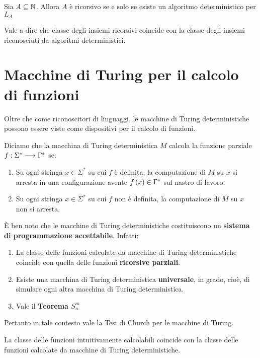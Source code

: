 \documentclass{lectures}
\begin{document}
\begin{theorem}
    Sia \(A\subseteq \mathbb{N}\). Allora \(A\) è ricorsivo se e solo se esiste un algoritmo deterministico per \(L_A\)
    
    Vale a dire che classe degli insiemi ricorsivi coincide con la classe degli insiemi riconosciuti da algoritmi deterministici.
\end{theorem}
\section{Macchine di Turing per il calcolo di funzioni}
\begin{definition}
    Oltre che come riconoscitori di linguaggi, le macchine di Turing deterministiche possono essere viste come dispositivi per il calcolo di funzioni.
    
    Diciamo che la macchina di Turing deterministica \(M\) calcola la funzione parziale \(f:\Sigma^*\longrightarrow \Gamma^*\) se:
    \begin{enumerate}
        \item Su ogni stringa \(x \in \Sigma^*\) su cui \(f\) è definita, la computazione di \(M\) su \(x\) si arresta in una configurazione avente \(f\left(x\right) \in \Gamma^*\) sul nastro di lavoro.
        \item Su ogni stringa \(x \in \Sigma^*\) su cui \(f\) non è definita, la computazione di \(M\) su \(x\) non si arresta.
    \end{enumerate}
\end{definition}
\begin{observation}
    È ben noto che le macchine di Turing deterministiche costituiscono un \textbf{sistema di programmazione accettabile}. Infatti:
    \begin{enumerate}
        \item La classe delle funzioni calcolate da macchine di Turing deterministiche coincide con quella delle funzioni \textbf{ricorsive parziali}.
        \item Esiste una macchina di Turing deterministica \textbf{universale}, in grado, cioè, di simulare ogni altra macchina di Turing deterministica.
        \item Vale il \textbf{Teorema \(S^{m}_n\)}
    \end{enumerate}
    Pertanto in tale contesto vale la Tesi di Church per le macchine di Turing.
\end{observation}
\begin{theorem}
    La classe delle funzioni intuitivamente calcolabili coincide con la classe delle funzioni calcolate da macchine di Turing deterministiche.
\end{theorem}
\clearpage
\end{document}
